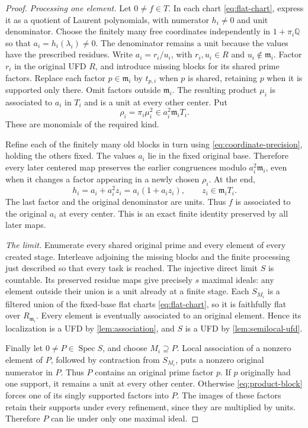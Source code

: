 \documentclass[11pt,reqno]{amsart}
\numberwithin{equation}{section}
\theoremstyle{plain}
\theoremstyle{definition}
\theoremstyle{remark}
\begin{document}
\begin{proof}
\emph{Processing one element.}
Let \(0\ne f\in T\). In each chart \eqref{eq:flat-chart},
express it as a quotient of Laurent polynomials, with numerator
\(h_i\ne0\) and unit denominator. Choose the finitely many
free coordinates independently in \(1+\pi_i\mathbb Q\) so
that \(a_i=h_i(\lambda_i)\ne0\). The denominator remains a
unit because the values have the prescribed residues.
Write \(a_i=r_i/u_i\), with \(r_i,u_i\in R\) and
\(u_i\notin\mathfrak m_i\). Factor \(r_i\) in the original
UFD \(R\), and introduce missing blocks for its shared prime
factors. Replace each factor \(p\in\mathfrak m_i\) by
\(t_{p,i}\) when \(p\) is shared, retaining \(p\) when it
is supported only there. Omit factors outside \(\mathfrak m_i\).
The resulting product \(\mu_i\) is associated to \(a_i\)
in \(T_i\) and is a unit at every other center. Put
\[
 \rho_i=\pi_i\mu_i^2\in a_i^2\mathfrak m_iT_i.
\]
These are monomials of the required kind.

Refine each of the finitely many old blocks in turn using
\eqref{eq:coordinate-precision}, holding the others fixed.
The values \(a_i\) lie in the fixed original base. Therefore
every later centered map preserves the earlier congruences
modulo \(a_i^2\mathfrak m_i\), even when it changes a factor
appearing in a newly chosen \(\rho_i\). At the end,
\[
 h_i=a_i+a_i^2z_i=a_i(1+a_i z_i),\qquad
 z_i\in\mathfrak m_iT_i.
\]
The last factor and the original denominator are units. Thus
\(f\) is associated to the original \(a_i\) at every center.
This is an exact finite identity preserved by all later maps.

\emph{The limit.}
Enumerate every shared original prime and every element of every
created stage. Interleave adjoining the missing blocks and the
finite processing just described so that every task is reached.
The injective direct limit \(S\) is countable. Its preserved
residue maps give precisely \(s\) maximal ideals: any element
outside their union is a unit already at a finite stage.
Each \(S_{M_i}\) is a filtered union of the fixed-base flat
charts \eqref{eq:flat-chart}, so it is faithfully flat over
\(R_{\mathfrak m_i}\). Every element is eventually associated
to an original element. Hence its localization is a UFD by
\cref{lem:association}, and \(S\) is a UFD by
\cref{lem:semilocal-ufd}.

Finally let \(0\ne P\in\operatorname{Spec}S\), and choose
\(M_i\supseteq P\). Local association of a nonzero element
of \(P\), followed by contraction from \(S_{M_i}\), puts a
nonzero original numerator in \(P\). Thus \(P\) contains an
original prime factor \(p\). If \(p\) originally had one
support, it remains a unit at every other center. Otherwise
\eqref{eq:product-block} forces one of its singly supported
factors into \(P\). The images of these factors retain their
supports under every refinement, since they are multiplied by
units. Therefore \(P\) can lie under only one maximal ideal.
\end{proof}
\end{document}
